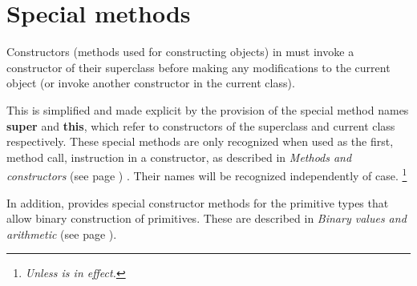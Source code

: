 \section{Special methods}\label{refspecm}
 
Constructors (methods used for constructing objects) in \nr{}
must invoke a constructor of their superclass before making any
modifications to the current object (or invoke another constructor in
the current class).
 
This is simplified and made explicit by the provision of the special
method names \textbf{super} and \textbf{this}, which refer to
constructors of the superclass and current class respectively.  These
special methods are only recognized when used as the first, method call,
instruction in a constructor, as described in
 \emph{Methods and constructors} (see page \pageref{refmethcon}) .
Their names will be recognized independently of case.
\footnote{
\emph{Unless  is in effect.
}
}
 
In addition, \nr{} provides special constructor methods for the
primitive types that allow binary construction of primitives.
These are described in  \emph{Binary values and arithmetic} (see page \pageref{refbincon}).
